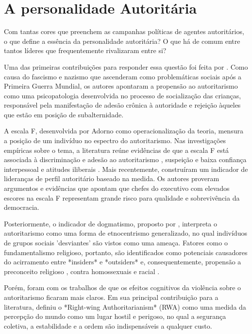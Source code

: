 \documentclass[
12pt,				%
openright,			%
twoside,			%
a4paper,			%
english,			%
french,				%
spanish,			%
brazil				%
]{abntex2}
\begin{document}
\section{A personalidade Autoritária}

Com tantas cores que preenchem as campanhas políticas de agentes autoritários, o que define a essência da personalidade autoritária? O que há de comum entre tantos líderes que frequentemente rivalizaram entre si?

Uma das primeiras contribuições para responder essa questão foi feita por . Como causa do fascismo e nazismo que ascenderam como problemáticas sociais após a Primeira Guerra Mundial, os autores apontaram a propensão ao autoritarismo como uma psicopatologia desenvolvida no processo de socialização das crianças, responsável pela manifestação de adesão crônica à autoridade e rejeição àqueles que estão em posição de subalternidade. 

A escala F, desenvolvida por Adorno como operacionalização da teoria, mensura a posição de um indivíduo no espectro do autoritarismo. Nas investigações empíricas sobre o tema, a literatura reúne evidências de que a escala F está associada à discriminação e adesão ao autoritarismo \cite{titus1957california, meloen1993f}, suspeição e baixa confiança interpessoal \cite{deutsch1960trust} e atitudes iliberais \cite{meloen1993f}. Mais recentemente,  construíram um indicador de lideranças de perfil autoritário baseado na medida. Os autores proveram argumentos e evidências que apontam que chefes do executivo com elevados escores na escala F representam grande risco para qualidade e sobrevivência da democracia.

Posteriormente, o indicador de dogmatismo, proposto por , interpreta o autoritarismo como uma forma de etnocentrismo generalizado, no qual indivíduos de grupos sociais 'desviantes' são vistos como uma ameaça. Fatores como o fundamentalismo religioso, portanto, são identificados como potenciais causadores do acirramento entre *insiders* e *outsiders* e, consequentemente, propensão a preconceito religioso \cite{laythe2001predicting}, contra homossexuais \cite{hunsberger1996religious, jonathan2008influence} e racial \cite{rowatt2004christian}.

Porém, foram com os trabalhos de  que os efeitos cognitivos da violência sobre o autoritarismo ficaram mais claros. Em sua principal contribuição para a literatura, definiu o *Right-wing Authoritarianism* (RWA) como uma medida da percepção do mundo como um lugar hostil e perigoso, no qual a segurança coletiva, a estabilidade e a ordem são indispensáveis a qualquer custo.
\end{document}
